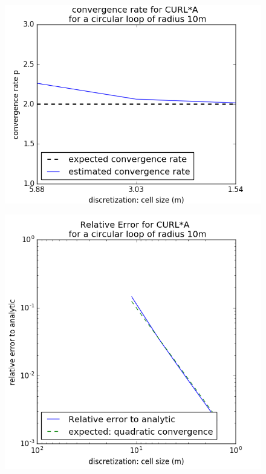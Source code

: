\documentclass[twoside]{article}
\begin{document}
\begin{figure}[H]
\centering
\begin{minipage}{0.5\textwidth}
  \centering
  \includegraphics[width=.9\linewidth]{./figures/initialisation/ConvergenceRate_initialisation.png}
  \label{Init_p}
\end{minipage}%
\begin{minipage}{.5\textwidth}
  \centering
  \includegraphics[width=.9\linewidth]{./figures/initialisation/relativeerror_Initialisation.png}
  \label{Init_eps}
\end{minipage}
\end{figure}
\end{document}
